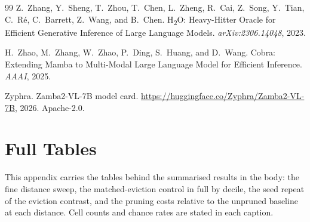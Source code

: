 \documentclass{article}
\begin{document}
\begin{thebibliography}{99}
Z.~Zhang, Y.~Sheng, T.~Zhou, T.~Chen, L.~Zheng, R.~Cai, Z.~Song, Y.~Tian,
C.~R\'e, C.~Barrett, Z.~Wang, and B.~Chen.
\newblock H\textsubscript{2}O: Heavy-Hitter Oracle for Efficient Generative
Inference of Large Language Models. \emph{arXiv:2306.14048}, 2023.

H.~Zhao, M.~Zhang, W.~Zhao, P.~Ding, S.~Huang, and D.~Wang.
\newblock Cobra: Extending Mamba to Multi-Modal Large Language Model for
Efficient Inference. \emph{AAAI}, 2025.

Zyphra.
\newblock Zamba2-VL-7B model card.
\newblock \url{https://huggingface.co/Zyphra/Zamba2-VL-7B}, 2026. Apache-2.0.

\end{thebibliography}

\appendix

\section{Full Tables}
\label{app:tables}

This appendix carries the tables behind the summarised results in the body: the
fine distance sweep, the matched-eviction control in full by decile, the seed
repeat of the eviction contrast, and the pruning costs relative to the unpruned
baseline at each distance. Cell counts and chance rates are stated in each
caption.
\end{document}
